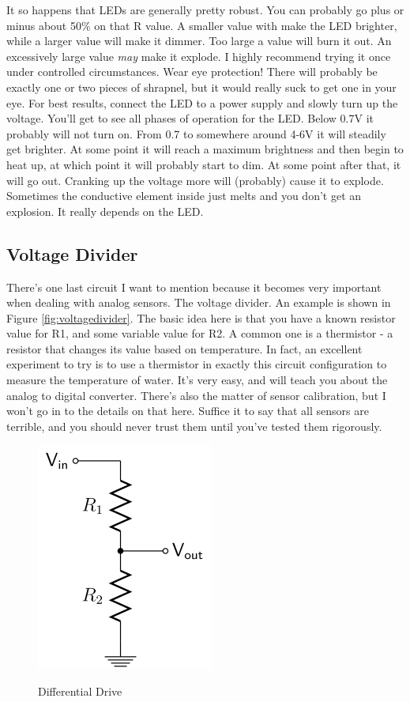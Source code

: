 It so happens that LEDs are generally pretty robust. You can probably go plus or minus about 50\% on that R value. A smaller value with make the LED brighter, while a larger value will make it dimmer. Too large a value will burn it out. An excessively large value \textit{may} make it explode. I highly recommend trying it once under controlled circumstances. Wear eye protection! There will probably be exactly one or two pieces of shrapnel, but it would really suck to get one in your eye. For best results, connect the LED to a power supply and slowly turn up the voltage. You'll get to see all phases of operation for the LED. Below 0.7V it probably will not turn on. From 0.7 to somewhere around 4-6V it will steadily get brighter. At some point it will reach a maximum brightness and then begin to heat up, at which point it will probably start to dim. At some point after that, it will go out. Cranking up the voltage more will (probably) cause it to explode. Sometimes the conductive element inside just melts and you don't get an explosion. It really depends on the LED.

\subsection{Voltage Divider}

There's one last circuit I want to mention because it becomes very important when dealing with analog sensors. The voltage divider. An example is shown in Figure \ref{fig:voltagedivider}. The basic idea here is that you have a known resistor value for R1, and some variable value for R2. A common one is a thermistor - a resistor that changes its value based on temperature. In fact, an excellent experiment to try is to use a thermistor in exactly this circuit configuration to measure the temperature of water. It's very easy, and will teach you about the analog to digital converter. There's also the matter of sensor calibration, but I won't go in to the details on that here. Suffice it to say that all sensors are terrible, and you should never trust them until you've tested them rigorously.

\begin{figure}[h]
\centering
\includegraphics[scale=0.75]{voltagedivider.png}
\label{fig:diffdrive}
\caption{Differential Drive}
\end{figure}

